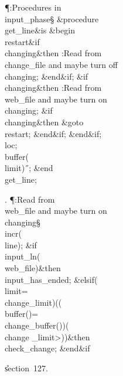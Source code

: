 \Y\P\?\4:Procedures in \\{input\_phase}\X\mathrel{+}\S\?\6
\&{procedure}\8\1\\{get\_line}\2\8\&{is}\8\1\6
\4\&{begin}\6
\4\BL\\{restart}\EL\8\&{if}\1\1\8\\{changing}\2\8\&{then}\6
:Read from \\{change\_file} and maybe turn off \\{changing}\X;\2\6
\&{end}\8\2\&{if}\1;\6
\&{if}\1\1\?\8\R\?\\{changing}\2\8\&{then}\6
:Read from \\{web\_file} and maybe turn on \\{changing}\X;\6
\&{if}\1\1\8\\{changing}\2\8\&{then}\6
\&{goto}\8\\{restart};\2\6
\&{end}\8\2\&{if}\1;\2\6
\&{end}\8\2\&{if}\1;\6
\\{loc}\?\K{};\5
\\{buffer}\?\1(\?\\{limit}\?\2)\K\?\H{\ };\2\6
\&{end}\8\\{get\_line};\par
\fi

. \P\?:Read from \\{web\_file} and maybe turn on \\{changing}\X\S\?\6
\\{incr}\?\1(\?\\{line}\?\2)\?;\6
\&{if}\1\1\?\8\R\?\\{input\_ln}\?\1(\?\\{web\_file}\?\2)\?\2\8\&{then}\6
\\{input\_has\_ended}\?\K\?;\6
\4\&{elsif}\1\?\8\1(\?\\{limit}\?=\?\\{change\_limit}\?\2)\ANT\1(\1(\?%
\\{buffer}\?\1(\?\2)=\?\\{change\_buffer}\?\1(\?\2)\2)\ANT\1(\?\\{change%
\_limit}\?>\?\2)\2)\?\2\8\&{then}\6
\\{check\_change};\2\6
\&{end}\8\2\&{if}\1\par
\U section~127.\fi

